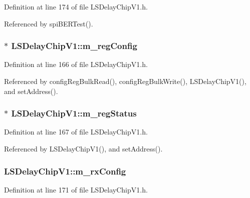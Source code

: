 Definition at line 174 of file LSDelayChipV1.h.

Referenced by spiBERTest().\hypertarget{classLSDelayChipV1_afd1cfdcb114549dc1466c77f07d39fe0}{
\subsubsection[{m\_\-regConfig}]{$\ast$ {\bf LSDelayChipV1::m\_\-regConfig}}}
\label{classLSDelayChipV1_afd1cfdcb114549dc1466c77f07d39fe0}


Definition at line 166 of file LSDelayChipV1.h.

Referenced by configRegBulkRead(), configRegBulkWrite(), LSDelayChipV1(), and setAddress().\hypertarget{classLSDelayChipV1_aaf118f103e89a35d2c449e8e3ffe8c20}{
\subsubsection[{m\_\-regStatus}]{$\ast$ {\bf LSDelayChipV1::m\_\-regStatus}}}
\label{classLSDelayChipV1_aaf118f103e89a35d2c449e8e3ffe8c20}


Definition at line 167 of file LSDelayChipV1.h.

Referenced by LSDelayChipV1(), and setAddress().\hypertarget{classLSDelayChipV1_a4818ac5c0d7ccf2845a01226234bdb67}{
\subsubsection[{m\_\-rxConfig}]{ {\bf LSDelayChipV1::m\_\-rxConfig}}}
\label{classLSDelayChipV1_a4818ac5c0d7ccf2845a01226234bdb67}


Definition at line 171 of file LSDelayChipV1.h.

